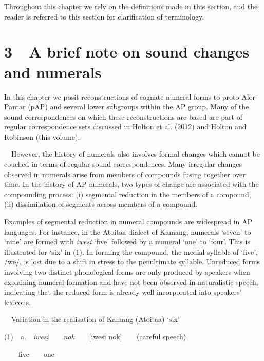 Throughout this chapter we rely on the definitions made in this section, and the reader is referred to this section for clarification of terminology.

\section[3\ \ A brief note on sound changes and numerals]{3\ \ A brief note on sound changes and numerals}
In this chapter we posit reconstructions of cognate numeral forms to proto-Alor-Pantar (pAP) and several lower subgroups within the AP group. Many of the sound correspondences on which these reconstructions are based are part of regular correspondence sets discussed in Holton et al. (2012) and Holton and Robinson (this volume). 

\ \ However, the history of numerals also involves formal changes which cannot be couched in terms of regular sound correspondences. Many irregular changes observed in numerals arise from members of compounds fusing together over time. In the history of AP numerals, two  types of change are associated with the compounding process: (i) segmental reduction in the members of a compound, (ii) dissimilation of segments across members of a compound. 

Examples of segmental reduction in numeral compounds are widespread in AP languages. For instance, in the Atoitaa dialect of Kamang, numerals {\textquoteleft}seven{\textquoteright} to {\textquoteleft}nine{\textquoteright} are formed with \textit{iwesi}\textit{{\ng}} {\textquoteleft}five{\textquoteright} followed by a numeral {\textquoteleft}one{\textquoteright} to {\textquoteleft}four{\textquoteright}. This is illustrated for {\textquoteleft}six{\textquoteright} in (1). In forming the compound, the medial syllable of {\textquoteleft}five{\textquoteright}, /we/, is lost due to a shift in stress to the penultimate syllable. Unreduced forms involving two distinct phonological forms are only produced by speakers when explaining numeral formation and have not been observed in naturalistic speech, indicating that the reduced form is already well incorporated into speakers{\textquoteright} lexicons.

\ \ Variation in the realisation of Kamang (Atoitaa) {\textquoteleft}six{\textquoteright}

(1)\ \ a.\ \ \textit{iwesi}\textit{{\ng}}\textit{\ \ \ \ nok\ \ \ \ }[i{\textquotesingle}wesi{\ng} {\textquotesingle}nok]\textit{\ \ \ \ }(careful speech)

\ \ \ \ five\ \ \ \ one\ \ 

